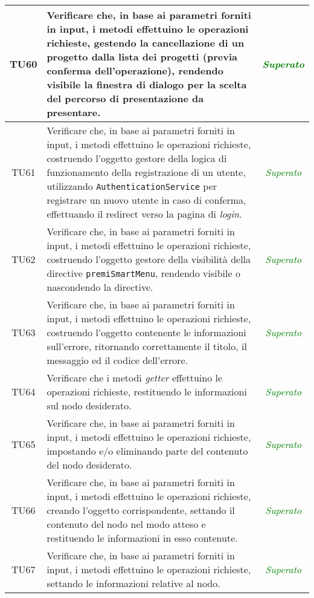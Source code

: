 \begin{longtable}{|c|>{}m{8cm}|c|}
\hypertarget{TU60}{TU60} & Verificare che, in base ai parametri forniti in input, i metodi effettuino le operazioni richieste, gestendo la cancellazione di un progetto dalla lista dei progetti (previa conferma dell'operazione), rendendo visibile la finestra di dialogo per la scelta del percorso di presentazione da presentare\finaleTestUnita{}. & \textcolor{Green}{\textit{Superato}}\\ \hline
\hypertarget{TU61}{TU61} & Verificare che, in base ai parametri forniti in input, i metodi effettuino le operazioni richieste, costruendo l'oggetto gestore della logica di funzionamento della registrazione di un utente, utilizzando \texttt{AuthenticationService} per registrare un nuovo utente in caso di conferma, effettuando il redirect verso la pagina di \textit{login}\finaleTestUnita{}. & \textcolor{Green}{\textit{Superato}}\\ \hline
\hypertarget{TU62}{TU62} & Verificare che, in base ai parametri forniti in input, i metodi effettuino le operazioni richieste, costruendo l'oggetto gestore della visibilità della directive \texttt{premiSmartMenu}, rendendo visibile o nascondendo la directive\finaleTestUnita{}. & \textcolor{Green}{\textit{Superato}}\\ \hline
\hypertarget{TU63}{TU63} & Verificare che, in base ai parametri forniti in input, i metodi effettuino le operazioni richieste, costruendo l'oggetto contenente le informazioni sull'errore, ritornando correttamente il titolo, il messaggio ed il codice dell'errore\finaleTestUnita{}. & \textcolor{Green}{\textit{Superato}}\\ \hline
\hypertarget{TU64}{TU64} & Verificare che i metodi \textit{getter} effettuino le operazioni richieste, restituendo le informazioni sul nodo desiderato\finaleTestUnita{}. & \textcolor{Green}{\textit{Superato}}\\ \hline
\hypertarget{TU65}{TU65} & Verificare che, in base ai parametri forniti in input, i metodi effettuino le operazioni richieste, impostando e/o eliminando parte del contenuto del nodo desiderato\finaleTestUnita{}. & \textcolor{Green}{\textit{Superato}}\\ \hline
\hypertarget{TU66}{TU66} & Verificare che, in base ai parametri forniti in input, i metodi effettuino le operazioni richieste, creando l'oggetto corrispondente, settando il contenuto del nodo nel modo atteso e restituendo le informazioni in esso contenute\finaleTestUnita{}. & \textcolor{Green}{\textit{Superato}}\\ \hline
\hypertarget{TU67}{TU67} & Verificare che, in base ai parametri forniti in input, i metodi effettuino le operazioni richieste, settando le informazioni relative al nodo\finaleTestUnita{}. & \textcolor{Green}{\textit{Superato}}\\ \hline

\end{longtable}
